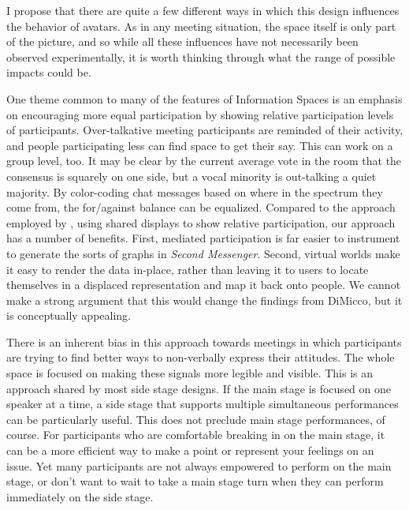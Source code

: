 I propose that there are quite a few different ways in which this design influences the behavior of avatars. As in any meeting situation, the space itself is only part of the picture, and so while all these influences have not necessarily been observed experimentally, it is worth thinking through what the range of possible impacts could be.

One theme common to many of the features of Information Spaces is an emphasis on encouraging more equal participation by showing relative participation levels of participants. Over-talkative meeting participants are reminded of their activity, and people participating less can find space to get their say. This can work on a group level, too. It may be clear by the current average vote in the room that the consensus is squarely on one side, but a vocal minority is out-talking a quiet majority. By color-coding chat messages based on where in the spectrum they come from, the for/against balance can be equalized. Compared to the approach employed by \citet{DiMicco:2007ie}, using shared displays to show relative participation, our approach has a number of benefits. First, mediated participation is far easier to instrument to generate the sorts of graphs in \emph{Second Messenger}. Second, virtual worlds make it easy to render the data in-place, rather than leaving it to users to locate themselves in a displaced representation and map it back onto people. We cannot make a strong argument that this would change the findings from DiMicco, but it is conceptually appealing.

There is an inherent bias in this approach towards meetings in which participants are trying to find better ways to non-verbally express their attitudes. The whole space is focused on making these signals more legible and visible. This is an approach shared by most side stage designs. If the main stage is focused on one speaker at a time, a side stage that supports multiple simultaneous performances can be particularly useful. This does not preclude main stage performances, of course. For participants who are comfortable breaking in on the main stage, it can be a more efficient way to make a point or represent your feelings on an issue. Yet many participants are not always empowered to perform on the main stage, or don't want to wait to take a main stage turn when they can perform immediately on the side stage.

